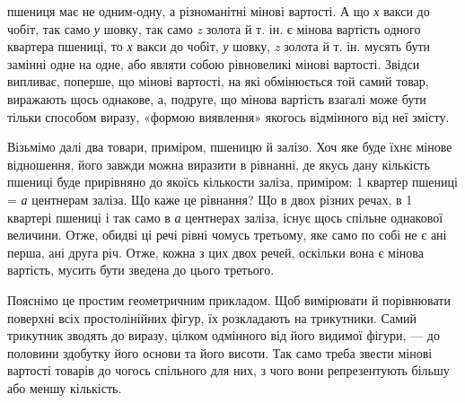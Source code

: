 \parcont{}  %
пшениця має не одним-одну, а різноманітні мінові вартості.
А що \emph{х} вакси до чобіт, так само \emph{у} шовку, так само \emph{z} золота
й т. ін. є мінова вартість одного квартера пшениці, то \emph{х} вакси до чобіт,
\emph{у} шовку, \emph{z} золота й т. ін. мусять бути замінні одне на одне, або
являти собою рівновеликі мінові вартості. Звідси випливає, поперше,
що мінові вартості, на які обмінюється той самий товар,
виражають щось однакове, а, подруге, що мінова вартість взагалі
може бути тільки способом виразу, «формою виявлення» якогось
відмінного від неї змісту.

Візьмімо далі два товари, приміром, пшеницю й залізо. Хоч
яке буде їхнє мінове відношення, його завжди можна виразити
в рівнанні, де якусь дану кількість пшениці буде прирівняно до
якоїсь кількости заліза, приміром: 1 квартер пшениці = \emph{а} центнерам
заліза. Що каже це рівнання? Що в двох різних речах,
в 1 квартері пшениці і так само в \emph{а} центнерах заліза, існує щось
спільне однакової величини. Отже, обидві ці речі рівні чомусь
третьому, яке само по собі не є ані перша, ані друга річ. Отже,
кожна з цих двох речей, оскільки вона є мінова вартість, мусить
бути зведена до цього третього.

Пояснімо це простим геометричним прикладом. Щоб вимірювати
й порівнювати поверхні всіх простолінійних фігур, їх розкладають
на трикутники. Самий трикутник зводять до виразу,
цілком одмінного від його видимої фігури, — до половини здобутку
його основи та його висоти. Так само треба звести мінові
вартості товарів до чогось спільного для них, з чого вони репрезентують
більшу або меншу кількість.

